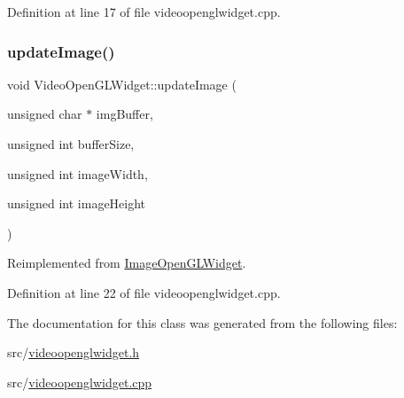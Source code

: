 Definition at line 17 of file videoopenglwidget.\+cpp.

\mbox{\label{class_video_open_g_l_widget_a116b4ee59731f274ba190167e9a91283}} 
\subsubsection{\texorpdfstring{updateImage()}{updateImage()}}
{\footnotesize\ttfamily void Video\+Open\+G\+L\+Widget\+::update\+Image (\begin{DoxyParamCaption}\item[{unsigned char $\ast$}]{img\+Buffer,  }\item[{unsigned int}]{buffer\+Size,  }\item[{unsigned int}]{image\+Width,  }\item[{unsigned int}]{image\+Height }\end{DoxyParamCaption})\hspace{0.3cm}{\ttfamily [virtual]}}



Reimplemented from \mbox{\hyperlink{class_image_open_g_l_widget_abb7d20bc625fc370bf2757a9ec3c1ac3}{Image\+Open\+G\+L\+Widget}}.



Definition at line 22 of file videoopenglwidget.\+cpp.



The documentation for this class was generated from the following files\+:\begin{DoxyCompactItemize}
\item 
src/\mbox{\hyperlink{videoopenglwidget_8h}{videoopenglwidget.\+h}}\item 
src/\mbox{\hyperlink{videoopenglwidget_8cpp}{videoopenglwidget.\+cpp}}\end{DoxyCompactItemize}
